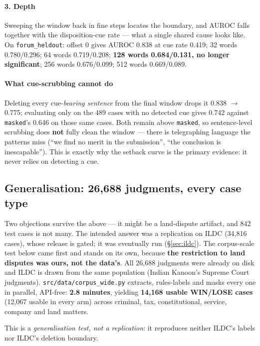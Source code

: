 \documentclass[12pt,a4paper]{article}
\newcommand{\code}[1]{\texttt{\small #1}}
\begin{document}
\paragraph{3. Depth} Sweeping the window back in fine steps locates the boundary, and AUROC falls
together with the disposition-cue rate --- what a single shared cause looks like. On
\code{forum\_heldout}: offset 0 gives AUROC 0.838 at cue rate 0.419; 32 words 0.780/0.296; 64 words
0.719/0.208; \textbf{128 words 0.684/0.131, no longer significant}; 256 words 0.676/0.099; 512 words
0.669/0.089.

\paragraph{What cue-scrubbing cannot do} Deleting every cue-\emph{bearing sentence} from the final
window drops it 0.838 $\rightarrow$ 0.775; evaluating only on the 489 cases with no detected cue
gives 0.742 against \code{masked}'s 0.646 on those same cases. Both remain above \code{masked}, so
sentence-level scrubbing does \textbf{not} fully clean the window --- there is telegraphing language
the patterns miss (``we find no merit in the submission'', ``the conclusion is inescapable''). This
is exactly why the setback curve is the primary evidence: it never relies on detecting a cue.

\subsection{Generalisation: 26,688 judgments, every case type}\label{sec:scale}

Two objections survive the above --- it might be a land-dispute artifact, and 842 test cases is not
many. The intended answer was a replication on ILDC (34,816 cases), whose release is gated; it was
eventually run (§\ref{sec:ildc}). The corpus-scale test below came first and stands on its own, because \textbf{the restriction to land disputes was ours, not the data's}.
All 26,688 judgments were already on disk and ILDC is drawn from the same population (Indian
Kanoon's Supreme Court judgments). \code{src/data/corpus\_wide.py} extracts, rules-labels and masks
every one in parallel, API-free: \textbf{2.8 minutes}, yielding \textbf{14,168 usable WIN/LOSE
cases} (12,067 usable in every arm) across criminal, tax, constitutional, service, company and land
matters.

This is a \emph{generalisation test, not a replication}: it reproduces neither ILDC's labels nor
ILDC's deletion boundary.
\end{document}
